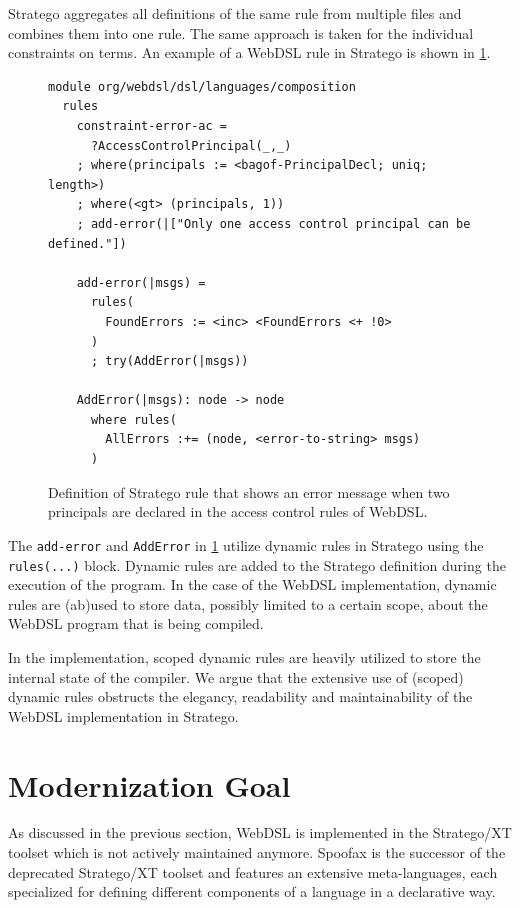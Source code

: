       Stratego aggregates all definitions of the same rule from multiple files and combines them into one rule. The same approach is taken for the individual constraints on terms. An example of a WebDSL rule in Stratego is shown in \cref{fig:webdsl-stratego-typecheck}.

      \begin{figure}
        \begin{verbatim}
module org/webdsl/dsl/languages/composition
  rules
    constraint-error-ac =
      ?AccessControlPrincipal(_,_)
    ; where(principals := <bagof-PrincipalDecl; uniq; length>)
    ; where(<gt> (principals, 1))
    ; add-error(|["Only one access control principal can be defined."])

    add-error(|msgs) =
      rules(
        FoundErrors := <inc> <FoundErrors <+ !0>
      )
      ; try(AddError(|msgs))

    AddError(|msgs): node -> node
      where rules(
        AllErrors :+= (node, <error-to-string> msgs)
      )
        \end{verbatim}
        \caption{\label{fig:webdsl-stratego-typecheck}Definition of Stratego rule that shows an error message when two principals are declared in the access control rules of WebDSL.}
      \end{figure}

      The \texttt{add-error} and \texttt{AddError} in \cref{fig:webdsl-stratego-typecheck} utilize dynamic rules in Stratego using the \texttt{rules(...)} block. Dynamic rules are added to the Stratego definition during the execution of the program. In the case of the WebDSL implementation, dynamic rules are (ab)used to store data, possibly limited to a certain scope, about the WebDSL program that is being compiled.

      In the implementation, scoped dynamic rules are heavily utilized to store the internal state of the compiler. We argue that the extensive use of (scoped) dynamic rules obstructs the elegancy, readability and maintainability of the WebDSL implementation in Stratego.

  \section{\label{sec:modernization}Modernization Goal}

    As discussed in the previous section, WebDSL is implemented in the Stratego/XT toolset which is not actively maintained anymore. Spoofax is the successor of the deprecated Stratego/XT toolset and features an extensive meta-languages, each specialized for defining different components of a language in a declarative way.

